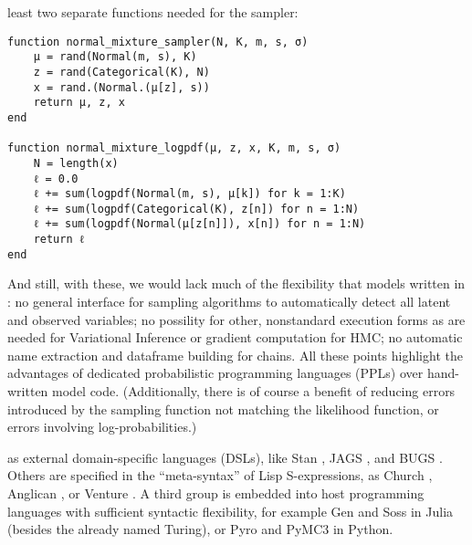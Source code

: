 least two separate functions needed for the sampler:
\begin{lstlisting}
function normal_mixture_sampler(N, K, m, s, σ)
    μ = rand(Normal(m, s), K)
    z = rand(Categorical(K), N)
    x = rand.(Normal.(μ[z], s))
    return μ, z, x
end

function normal_mixture_logpdf(μ, z, x, K, m, s, σ)
    N = length(x)
    ℓ = 0.0
    ℓ += sum(logpdf(Normal(m, s), μ[k]) for k = 1:K)
    ℓ += sum(logpdf(Categorical(K), z[n]) for n = 1:N)
    ℓ += sum(logpdf(Normal(μ[z[n]]), x[n]) for n = 1:N)
    return ℓ
end
\end{lstlisting}
And still, with these, we would lack much of the flexibility that models written in \turingjl: no
general interface for sampling algorithms to automatically detect all latent and observed variables;
no possility for other, nonstandard execution forms as are needed for Variational Inference or
gradient computation for HMC; no automatic name extraction and dataframe building for chains.  All
these points highlight the advantages of dedicated probabilistic programming languages (PPLs) over
hand-written model code.  (Additionally, there is of course a benefit of reducing errors introduced
by the sampling function not matching the likelihood function, or errors involving
log-probabilities.)

 as external domain-specific languages (DSLs), like Stan
\parencite{carpenter2017stan}, JAGS \parencite{plummer2003jags}, and BUGS
\parencite{lunn2000winbugs,lunn2009bugs}.  Others are specified in the \enquote{meta-syntax} of Lisp
S-expressions, as Church \parencite{goodman2012church}, Anglican \parencite{wood2015new}, or Venture
\parencite{mansinghka2014venture}.  A third group is embedded into host programming languages with
sufficient syntactic flexibility, for example Gen \parencite{cusumano-towner2020gen} and Soss
\parencite{scherrer2019soss} in Julia (besides the already named Turing), or Pyro
\parencite{bingham2018pyro} and PyMC3 \parencite{salvatier2016probabilistic} in Python.

